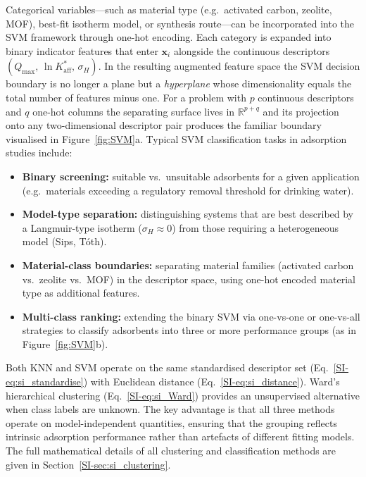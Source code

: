 \documentclass[journal=jacsat,manuscript=article]{achemso}
\begin{document}
	Categorical variables---such as material type (e.g.\ activated carbon, zeolite, MOF), best-fit isotherm model, or synthesis route---can be incorporated into the SVM framework through one-hot encoding. Each category is expanded into binary indicator features that enter $\mathbf{x}_i$ alongside the continuous descriptors $(Q_{\max},\, \ln K_{\mathrm{aff}}^{\ast},\, \sigma_H)$. In the resulting augmented feature space the SVM decision boundary is no longer a plane but a \emph{hyperplane} whose dimensionality equals the total number of features minus one. For a problem with $p$ continuous descriptors and $q$ one-hot columns the separating surface lives in $\mathbb{R}^{p+q}$ and its projection onto any two-dimensional descriptor pair produces the familiar boundary visualised in Figure~\ref{fig:SVM}a. Typical SVM classification tasks in adsorption studies include:
	\begin{itemize}
		\item \textbf{Binary screening:} suitable vs.\ unsuitable adsorbents for a given application (e.g.\ materials exceeding a regulatory removal threshold for drinking water).
		\item \textbf{Model-type separation:} distinguishing systems that are best described by a Langmuir-type isotherm ($\sigma_H \approx 0$) from those requiring a heterogeneous model (Sips, T\'{o}th).
		\item \textbf{Material-class boundaries:} separating material families (activated carbon vs.\ zeolite vs.\ MOF) in the descriptor space, using one-hot encoded material type as additional features.
		\item \textbf{Multi-class ranking:} extending the binary SVM via one-vs-one or one-vs-all strategies to classify adsorbents into three or more performance groups (as in Figure~\ref{fig:SVM}b).
	\end{itemize}

	Both KNN and SVM operate on the same standardised descriptor set (Eq.~\ref{SI-eq:si_standardise}) with Euclidean distance (Eq.~\ref{SI-eq:si_distance}). Ward's hierarchical clustering (Eq.~\ref{SI-eq:si_Ward}) provides an unsupervised alternative when class labels are unknown. The key advantage is that all three methods operate on model-independent quantities, ensuring that the grouping reflects intrinsic adsorption performance rather than artefacts of different fitting models. The full mathematical details of all clustering and classification methods are given in Section~\ref{SI-sec:si_clustering}.
\end{document}
